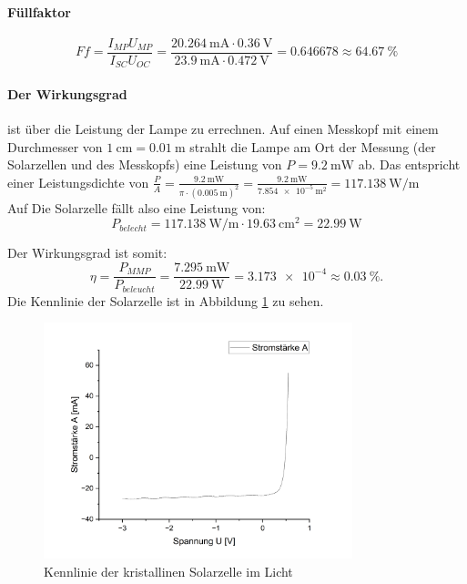 \documentclass[12pt,a4paper,ngerman]{report}
\begin{document}
		\paragraph{Füllfaktor}
		
		$$    Ff=\frac{I_{MP}U_{MP}}{I_{SC}U_{OC}}= \frac{\qty{20,264}{\milli\ampere}\cdot \qty{0,36}{\volt}}{\qty{23,9}{\milli\ampere} \cdot \qty{0,472}{\volt}} = \num{0,646678} \approx \qty{64,67}{\percent}  $$
		
		\paragraph{Der Wirkungsgrad} ist über die Leistung der Lampe zu errechnen. Auf einen Messkopf mit einem Durchmesser von $\SI{1}{\centi\m} = \qty{0,01}{\m}$ strahlt die Lampe am Ort der Messung (der Solarzellen und des Messkopfs) eine Leistung von $P = \SI{9,2}{\milli\watt} $ ab. Das entspricht einer Leistungsdichte von $\frac{P}{A} = \frac{\qty{9,2}{\milli\watt}}{\pi\cdot(\qty{0,005}{\m})^2} = \frac{\qty{9,2}{\milli\watt}}{\qty{7,854e-5}{\square\metre}} = \qty{117,138}{\watt\per\m} $\\
		Auf Die Solarzelle fällt also eine Leistung von:
		\[P_ {belecht} = \qty{117,138}{\watt\per\m} \cdot \qty{19,63}{\centi\m^2} = \qty{22,99}{\watt}\]
		
		Der Wirkungsgrad ist somit:
		$$
		\eta=\frac{P_{MMP}}{P_{beleucht}} = \frac{\qty{7,295}{\milli\watt}}{\qty{22,99}{\watt}} = \num{3,173e-4} \approx \qty{0,03}{\percent}.
		$$
		Die Kennlinie der Solarzelle ist in Abbildung \ref{fig:SolarKristallinHell} zu sehen.\\
		
		\begin{figure}
			\centering
			\includegraphics[width=0.8\textwidth]{Origin/SolarKristallHell.png}
			\caption{Kennlinie der kristallinen Solarzelle im Licht}
			\label{fig:SolarKristallinHell}
		\end{figure}
				
\end{document}

